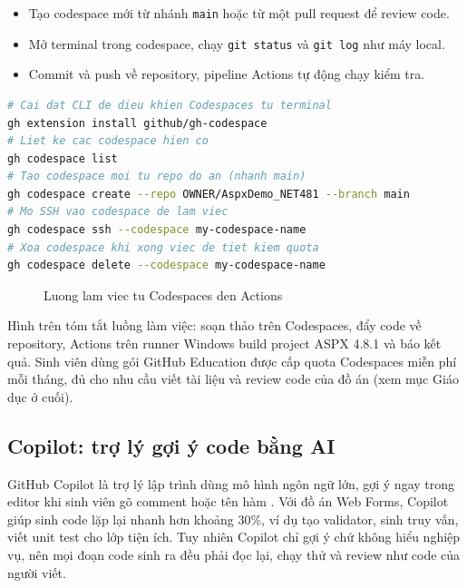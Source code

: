 \begin{itemize}
\item Tạo codespace mới từ nhánh \verb|main| hoặc từ một pull request để review code.
\item Mở terminal trong codespace, chạy \verb|git status| và \verb|git log| như máy local.
\item Commit và push về repository, pipeline Actions tự động chạy kiểm tra.
\end{itemize}

\begin{lstlisting}[language=bash]
# Cai dat CLI de dieu khien Codespaces tu terminal
gh extension install github/gh-codespace
# Liet ke cac codespace hien co
gh codespace list
# Tao codespace moi tu repo do an (nhanh main)
gh codespace create --repo OWNER/AspxDemo_NET481 --branch main
# Mo SSH vao codespace de lam viec
gh codespace ssh --codespace my-codespace-name
# Xoa codespace khi xong viec de tiet kiem quota
gh codespace delete --codespace my-codespace-name
\end{lstlisting}

\begin{figure}[H]
\centering
{}
\caption{Luong lam viec tu Codespaces den Actions}
\label{fig:c43-codespaces-flow}
\end{figure}

Hình trên tóm tắt luồng làm việc: soạn thảo trên Codespaces, đẩy code về
repository, Actions trên runner Windows build project ASPX 4.8.1 và báo kết quả.
Sinh viên dùng gói GitHub Education được cấp quota Codespaces miễn phí mỗi tháng,
đủ cho nhu cầu viết tài liệu và review code của đồ án (xem mục Giáo dục ở cuối).

\subsection{Copilot: trợ lý gợi ý code bằng AI}

GitHub Copilot là trợ lý lập trình dùng mô hình ngôn ngữ lớn,
gợi ý ngay trong editor khi sinh viên gõ comment hoặc tên hàm \cite{githubdocs}.
Với đồ án Web Forms, Copilot giúp sinh code lặp lại nhanh hơn khoảng 30\%,
ví dụ tạo validator, sinh truy vấn, viết unit test cho lớp tiện ích.
Tuy nhiên Copilot chỉ gợi ý chứ không hiểu nghiệp vụ, nên mọi đoạn code sinh ra
đều phải đọc lại, chạy thử và review như code của người viết.

